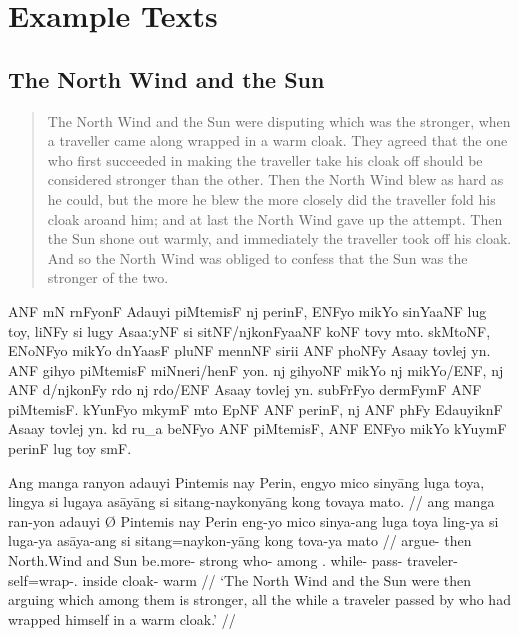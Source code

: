 \chapter{Example Texts}

\section{The North Wind and the Sun}
\label{sec:northwind}
\citep[From][]{becker:northwind}

\blockcquote[After Aesop;][39]{ipa2007}{The North Wind and the Sun were
disputing which was the stronger, when a traveller came along wrapped in a warm
cloak. They agreed that the one who first succeeded in making the traveller
take his cloak off should be considered stronger than the other. Then the North
Wind blew as hard as he could, but the more he blew the more closely did the
traveller fold his cloak aroand him; and at last the North Wind gave up the
attempt. Then the Sun shone out warmly, and immediately the traveller took off
his cloak. And so the North Wind was obliged to confess that the Sun was the
stronger of the two.}

\begin{flushleft}
\noindent\Tagati ANF mN rnFyonF Adauyi piMtemisF nj perinF, ENFyo mikYo
sinYaaNF lug toy, liNFy si lugy AsaaːyNF si sitNF/njkonFyaaNF koNF tovy mto.
skMtoNF, ENoNFyo mikYo dnYaasF pluNF mennNF sirii ANF phoNFy Asaay tovlej yn.
ANF gihyo piM\-temisF miNneri/henF yon. nj gi\-h\-yoNF mikYo nj mikYo/ENF, nj
ANF d/njkonFy rdo nj rdo/ENF Asaay tovlej yn. su\-bFrFyo dermFymF ANF
piMtemisF. kYunFyo mkymF mto EpNF ANF perinF, nj ANF phFy EdauyiknF Asaay
tovlej yn. kd ru\_a beNFyo ANF piMtemisF, ANF ENFyo mikYo kYuymF perinF lug toy
smF.
\end{flushleft}

\medskip

\ex %
\begingl
	\gla Ang manga ranyon adauyi {} Pintemis nay Perin, engyo mico sinyāng 
		luga toya, lingya si lugaya asāyāng si sitang-naykonyāng kong tovaya
		mato. //
	\glb ang manga ran-yon adauyi Ø Pintemis nay Perin eng-yo mico sinya-ang
		luga toya ling-ya si luga-ya asāya-ang si sitang=naykon-yāng kong
		tova-ya mato //
	\glc \AgtT{} \Prog{} argue-\TplN{} then \Top{} North.Wind and Sun
		be.more-\TsgN{} strong who-\Aarg{} among \TplN{}.\Loc{}
		while-\Loc{} \Rel{} pass-\TsgM{} traveler-\Aarg{} \Rel{}
		self=wrap-\TsgM{}.\Aarg{} inside cloak-\Loc{} warm //
	\glft `The North Wind and the Sun were then arguing which among them is
		stronger, all the while a traveler passed by who had wrapped himself in
		a warm cloak.' //
\endgl
\xe

